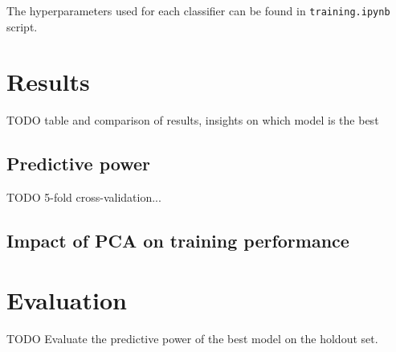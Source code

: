 \documentclass[10pt, twocolumn]{article}
\begin{document}
The hyperparameters used for each classifier can be found in \texttt{training.ipynb} script.

\section{Results}
TODO table and comparison of results, insights on which model is the best
\subsection{Predictive power}
TODO 5-fold cross-validation... 

\subsection{Impact of PCA on training performance}

\section{Evaluation}
TODO Evaluate the predictive power of the best model on the holdout set.


\medskip
 


\end{document}
